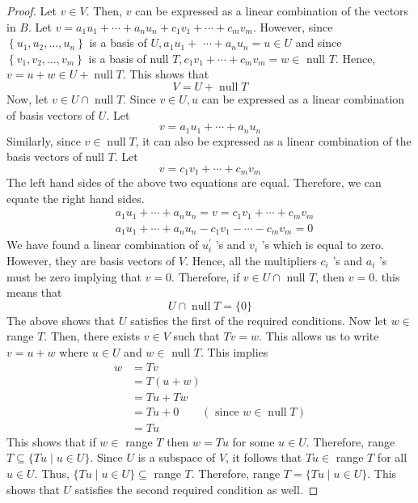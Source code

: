 \documentclass{article}
\theoremstyle{definition}
\begin{document}
\begin{proof}
Let $v \in V$. Then, $v$ can be expressed as a linear combination of the vectors in $B$.
Let $v=a_1 u_1+\cdots+a_n u_n+c_1 v_1+\cdots+c_m v_m$. However, since $\left\{u_1, u_2, \ldots, u_n\right\}$ is a basis of $U, a_1 u_1+$ $\cdots+a_n u_n=u \in U$ and since $\left\{v_1, v_2, \ldots, v_m\right\}$ is a basis of null $T, c_1 v_1+\cdots+c_m v_m=w \in$ null $T$.
Hence, $v=u+w \in U+\operatorname{null} T$. This shows that
$$
V=U+\operatorname{null} T
$$
Now, let $v \in U \cap \operatorname{null} T$.
Since $v \in U, u$ can be expressed as a linear combination of basis vectors of $U$. Let
$$
v=a_1 u_1+\cdots+a_n u_n
$$
Similarly, since $v \in \operatorname{null} T$, it can also be expressed as a linear combination of the basis vectors of null $T$. Let
$$
v=c_1 v_1+\cdots+c_m v_m
$$
The left hand sides of the above two equations are equal. Therefore, we can equate the right hand sides.
$$
\begin{aligned}
& a_1 u_1+\cdots+a_n u_n=v=c_1 v_1+\cdots+c_m v_m \\
& a_1 u_1+\cdots+a_n u_n-c_1 v_1-\cdots-c_m v_m=0
\end{aligned}
$$
We have found a linear combination of $u_i^{\prime}$ 's and $v_i$ 's which is equal to zero. However, they are basis vectors of $V$. Hence, all the multipliers $c_i$ 's and $a_i$ 's must be zero implying that $v=0$.
Therefore, if $v \in U \cap$ null $T$, then $v=0$. this means that
$$
U \cap \operatorname{null} T=\{0\}
$$
The above shows that $U$ satisfies the first of the required conditions.
Now let $w \in$ range $T$. Then, there exists $v \in V$ such that $T v=w$. This allows us to write $v=u+w$ where $u \in U$ and $w \in$ null $T$. This implies
$$
\begin{aligned}
w & =T v \\
& =T(u+w) \\
& =T u+T w \\
& =T u+0 \quad \quad(\text { since } w \in \operatorname{null} T) \\
& =T u
\end{aligned}
$$
This shows that if $w \in$ range $T$ then $w=T u$ for some $u \in U$. Therefore, range $T \subseteq\{T u \mid u \in U\}$.
Since $U$ is a subspace of $V$, it follows that $T u \in$ range $T$ for all $u \in U$. Thus, $\{T u \mid u \in U\} \subseteq$ range $T$.
Therefore, range $T=\{T u \mid u \in U\}$.
This shows that $U$ satisfies the second required condition as well.
\end{proof}
\end{document}
